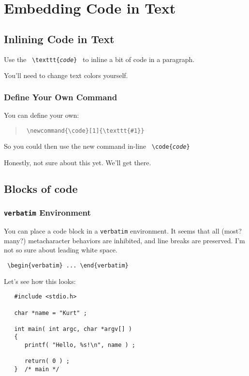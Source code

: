 
\chapter{Embedding Code in Text}
\label{embeddingcode} 

\section{Inlining Code in Text}
\label{inlinecode}

Use the  \texttt{ \textbackslash{}texttt\{\textit{code}\} } to inline a bit of code
in a paragraph.

You'll need to change text colors yourself.

\subsection{ Define Your Own Command }

You can define your own:

\begin{quote}
	\texttt{
		\textbackslash{}newcommand\{\textbackslash{}code\}[1]\{\textbackslash{}texttt\{\#1\}\}
	}
\end{quote}

\newcommand{\code}[1]{\texttt{#1}}

So you could then use the new command in-line 
\texttt{ \textbackslash{}code\{\textit{code}\} }

Honestly, not sure about this yet.  We'll get there.


\section{ Blocks of code }
\label{codeblock}

\subsection{ \texttt{verbatim} Environment }
\label{verbatim}

You can place a code block in a \texttt{verbatim} environment.  It seems that
all (most? many?) metacharacter behaviors are inhibited, and line breaks are
preserved.  I'm not so sure about leading white space.

\texttt{
	\textbackslash{}begin\{verbatim\}
		...
	\textbackslash{}end\{verbatim\}
}

Let's see how this looks:

\begin{verbatim}
   #include <stdio.h>

   char *name = "Kurt" ;

   int main( int argc, char *argv[] )
   {
      printf( "Hello, %s!\n", name ) ;

      return( 0 ) ;
   }  /* main */
\end{verbatim}

